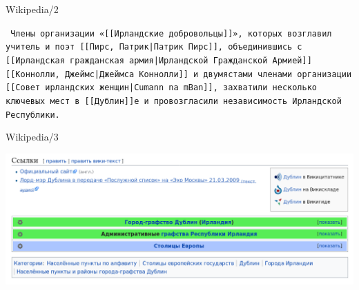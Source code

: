 \documentclass[10pt, compress]{beamer}
\begin{document}
\begin{frame}{Wikipedia/2}

{\tt
Члены организации «[[Ирландские добровольцы]]», которых возглавил учитель 
и поэт [[Пирс, Патрик|Патрик Пирс]], объединившись с [[Ирландская гражданская армия|Ирландской Гражданской Армией]] [[Коннолли, Джеймс|Джеймса Коннолли]] и двумястами членами организации [[Совет ирландских женщин|Cumann na mBan]], захватили несколько ключевых мест в \alert<2>{[[Дублин]]е} и провозгласили независимость Ирландской Республики. 
}
\end{frame}

\begin{frame}{Wikipedia/3}

\includegraphics[width=\textwidth]{graphics/wikipedia-2.png}

\end{frame}
\end{document}
